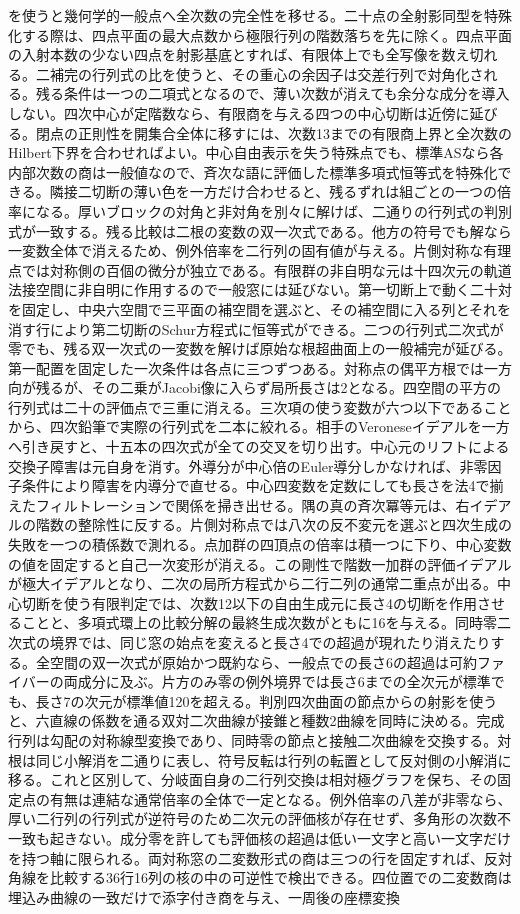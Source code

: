 \documentclass[11pt,a4paper]{ltjsarticle}
\begin{document}
を使うと幾何学的一般点へ全次数の完全性を移せる。二十点の全射影同型を特殊化する際は、四点平面の最大点数から極限行列の階数落ちを先に除く。四点平面の入射本数の少ない四点を射影基底とすれば、有限体上でも全写像を数え切れる。二補完の行列式の比を使うと、その重心の余因子は交差行列で対角化される。残る条件は一つの二項式となるので、薄い次数が消えても余分な成分を導入しない。四次中心が定階数なら、有限商を与える四つの中心切断は近傍に延びる。閉点の正則性を開集合全体に移すには、次数13までの有限商上界と全次数のHilbert下界を合わせればよい。中心自由表示を失う特殊点でも、標準ASなら各内部次数の商は一般値なので、斉次な語に評価した標準多項式恒等式を特殊化できる。隣接二切断の薄い色を一方だけ合わせると、残るずれは組ごとの一つの倍率になる。厚いブロックの対角と非対角を別々に解けば、二通りの行列式の判別式が一致する。残る比較は二根の変数の双一次式である。他方の符号でも解なら一変数全体で消えるため、例外倍率を二行列の固有値が与える。片側対称な有理点では対称側の百個の微分が独立である。有限群の非自明な元は十四次元の軌道法接空間に非自明に作用するので一般窓には延びない。第一切断上で動く二十対を固定し、中央六空間で三平面の補空間を選ぶと、その補空間に入る列とそれを消す行により第二切断のSchur方程式に恒等式ができる。二つの行列式二次式が零でも、残る双一次式の一変数を解けば原始な根超曲面上の一般補完が延びる。第一配置を固定した一次条件は各点に三つずつある。対称点の偶平方根では一方向が残るが、その二乗がJacobi像に入らず局所長さは2となる。四空間の平方の行列式は二十の評価点で三重に消える。三次項の使う変数が六つ以下であることから、四次鉛筆で実際の行列式を二本に絞れる。相手のVeroneseイデアルを一方へ引き戻すと、十五本の四次式が全ての交叉を切り出す。中心元のリフトによる交換子障害は元自身を消す。外導分が中心倍のEuler導分しかなければ、非零因子条件により障害を内導分で直せる。中心四変数を定数にしても長さを法4で揃えたフィルトレーションで関係を掃き出せる。隅の真の斉次冪等元は、右イデアルの階数の整除性に反する。片側対称点では八次の反不変元を選ぶと四次生成の失敗を一つの積係数で測れる。点加群の四頂点の倍率は積一つに下り、中心変数の値を固定すると自己一次変形が消える。この剛性で階数一加群の評価イデアルが極大イデアルとなり、二次の局所方程式から二行二列の通常二重点が出る。中心切断を使う有限判定では、次数12以下の自由生成元に長さ4の切断を作用させることと、多項式環上の比較分解の最終生成次数がともに16を与える。同時零二次式の境界では、同じ窓の始点を変えると長さ4での超過が現れたり消えたりする。全空間の双一次式が原始かつ既約なら、一般点での長さ6の超過は可約ファイバーの両成分に及ぶ。片方のみ零の例外境界では長さ6までの全次元が標準でも、長さ7の次元が標準値120を超える。判別四次曲面の節点からの射影を使うと、六直線の係数を通る双対二次曲線が接錐と種数2曲線を同時に決める。完成行列は勾配の対称線型変換であり、同時零の節点と接触二次曲線を交換する。対根は同じ小解消を二通りに表し、符号反転は行列の転置として反対側の小解消に移る。これと区別して、分岐面自身の二行列交換は相対極グラフを保ち、その固定点の有無は連結な通常倍率の全体で一定となる。例外倍率の八差が非零なら、厚い二行列の行列式が逆符号のため二次元の評価核が存在せず、多角形の次数不一致も起きない。成分零を許しても評価核の超過は低い一文字と高い一文字だけを持つ軸に限られる。両対称窓の二変数形式の商は三つの行を固定すれば、反対角線を比較する36行16列の核の中の可逆性で検出できる。四位置での二変数商は埋込み曲線の一致だけで添字付き商を与え、一周後の座標変換
\end{document}
